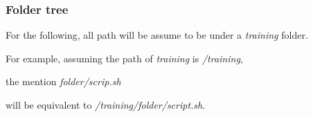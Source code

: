 	\begin{frame}
		\frametitle{Folder tree}
		
		For the following, all path will be assume to be under a \textit{training} folder.
		
		\bigskip
		
		For example, assuming the path of \textit{training} is \textit{/training},
		
		the mention \textit{folder/scrip.sh} 
		
		will be equivalent to \textit{/training/folder/script.sh}.
		
	\end{frame}